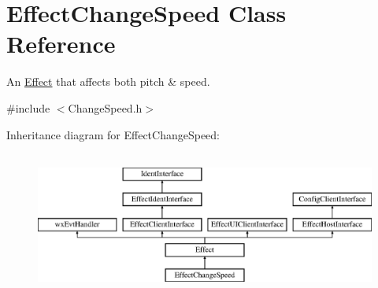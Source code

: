 \hypertarget{class_effect_change_speed}{}\section{Effect\+Change\+Speed Class Reference}
\label{class_effect_change_speed}


An \hyperlink{class_effect}{Effect} that affects both pitch \& speed.  




{\ttfamily \#include $<$Change\+Speed.\+h$>$}

Inheritance diagram for Effect\+Change\+Speed\+:\begin{figure}[H]
\begin{center}
\leavevmode
\includegraphics[height=4.794520cm]{class_effect_change_speed}
\end{center}
\end{figure}
